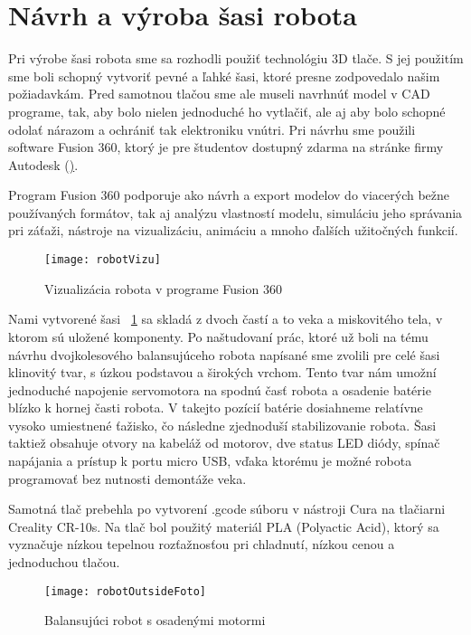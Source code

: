\section{Návrh a výroba šasi robota}
Pri výrobe šasi robota sme sa rozhodli použiť technológiu 3D tlače. S jej použitím sme boli schopný vytvoriť pevné a ľahké šasi, ktoré presne zodpovedalo našim požiadavkám. Pred samotnou tlačou sme ale museli navrhnúť model v CAD programe, tak, aby bolo nielen jednoduché ho vytlačiť, ale aj aby bolo schopné odolať nárazom a ochrániť tak elektroniku vnútri. Pri návrhu sme použili software Fusion 360, ktorý je pre študentov dostupný zdarma na stránke firmy Autodesk (\href{https://www.autodesk.com/products/fusion-360/overview}).

Program Fusion 360 podporuje ako návrh a export modelov do viacerých bežne používaných formátov, tak aj analýzu vlastností modelu, simuláciu jeho správania pri záťaži, nástroje na vizualizáciu, animáciu a mnoho ďalších užitočných funkcií.

\begin{figure}
\centering
\texttt{[image: robotVizu]}
\caption{Vizualizácia robota v programe Fusion 360}
\label{fig:robotVizu}
\end{figure}

Nami vytvorené šasi \figurename~\ref{fig:robotVizu} sa skladá z dvoch častí a to veka a miskovitého tela, v ktorom sú uložené komponenty. Po naštudovaní prác, ktoré už boli na tému návrhu dvojkolesového balansujúceho robota napísané sme zvolili pre celé šasi klinovitý tvar, s úzkou podstavou a širokých vrchom. Tento tvar nám umožní jednoduché napojenie servomotora na spodnú časť robota a osadenie batérie blízko k hornej časti robota. V takejto pozícií batérie dosiahneme relatívne vysoko umiestnené ťažisko, čo následne zjednoduší stabilizovanie robota. Šasi taktiež obsahuje otvory na kabeláž od motorov, dve status LED diódy, spínač napájania a prístup k portu micro USB, vďaka ktorému je možné robota programovať bez nutnosti demontáže veka.

Samotná tlač prebehla po vytvorení .gcode súboru v nástroji Cura na tlačiarni Creality CR-10s. Na tlač bol použitý materiál PLA (Polyactic Acid), ktorý sa vyznačuje nízkou tepelnou rozťažnosťou pri chladnutí, nízkou cenou a jednoduchou tlačou. 

\begin{figure}
\centering
\texttt{[image: robotOutsideFoto]}
\caption{Balansujúci robot s osadenými motormi}
\label{fig:robotOutsideFoto}
\end{figure}

